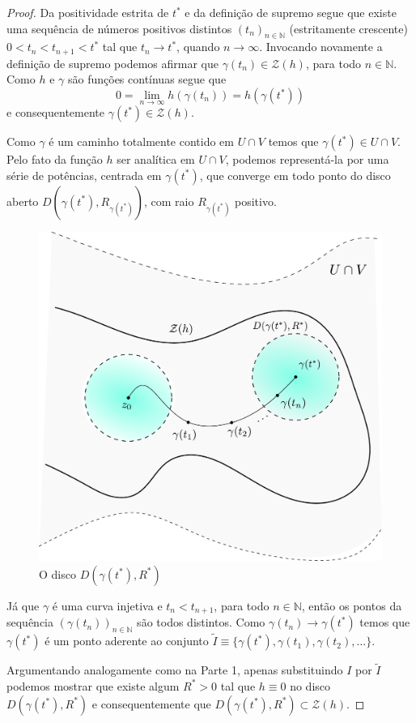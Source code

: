 \begin{proof}
\medskip 




Da positividade estrita de $t^{*}$ e da definição de supremo segue 
que existe uma sequência de números positivos
distintos $(t_n)_{n\in\mathbb{N}}$ (estritamente crescente) $0<t_n< t_{n+1}<t^{*}$ tal que $t_n\to t^{*}$, quando $n\to\infty$. 
Invocando novamente a definição de supremo podemos afirmar que 
$\gamma(t_n)\in \mathcal{Z}(h)$, para todo $n\in\mathbb{N}$.
Como $h$ e $\gamma$ são funções contínuas segue que
\[
0
=
\lim_{n\to\infty} h(\gamma(t_n))
= 
h(\gamma(t^{*}))
\]
e consequentemente $\gamma(t^{*})\in\mathcal{Z}(h)$. 

Como $\gamma$ é um caminho totalmente contido em $U\cap V$ temos
que $\gamma(t^{*})\in U\cap V$. Pelo fato da função $h$ ser analítica em 
$U\cap V$, podemos representá-la por uma série de potências, centrada 
em $\gamma(t^{*})$, que converge em 
todo ponto do disco aberto $D( \gamma(t^{*}), R_{\gamma(t^{*})})$, 
com raio $R_{\gamma(t^{*})}$ positivo. 


\begin{figure}[H]
\centering
\includegraphics[width=0.6\linewidth]{Figuras/zeros-isolados6}
\caption{O disco $D(\gamma(t^{*}),R^{*})$}
\label{fig:zeros-isolados6}
\end{figure}



Já que $\gamma$ é uma curva injetiva  e $t_n<t_{n+1}$, para todo $n\in\mathbb{N}$,
então os pontos da sequência $(\gamma(t_n))_{n\in\mathbb{N}}$ são todos
distintos. Como $\gamma(t_n)\to \gamma(t^{*})$ temos que $\gamma(t^{*})$
é um ponto aderente ao conjunto $\widetilde{I}\equiv \{\gamma(t^{*}),\gamma(t_1),\gamma(t_2),\ldots\}$.

Argumentando analogamente como na Parte 1, apenas substituindo $I$ por $\widetilde{I}$ 
podemos mostrar que existe algum $R^*>0$ tal que $h\equiv 0$
no disco $D(\gamma(t^*),R^{*})$ e consequentemente que 
$D(\gamma(t^*),R^{*})\subset\mathcal{Z}(h)$.


\end{proof}
